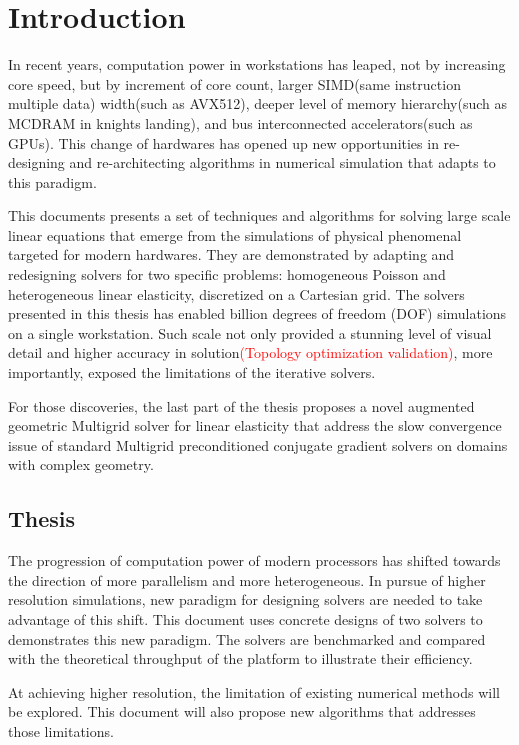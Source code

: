 \chapter{Introduction}
In recent years, computation power in workstations has leaped, not by increasing core speed,  but by increment of core count, larger SIMD(same instruction multiple data) width(such as AVX512), deeper level of memory hierarchy(such as MCDRAM in knights landing), and bus interconnected accelerators(such as GPUs). This change of hardwares has opened up new opportunities in re-designing and re-architecting algorithms in numerical simulation that adapts to this paradigm.

This documents presents a set of techniques and algorithms for solving large scale linear equations that emerge from the simulations of physical phenomenal targeted for modern hardwares. They are demonstrated by adapting and redesigning solvers for two specific problems: homogeneous Poisson and heterogeneous linear elasticity, discretized on a Cartesian grid. The solvers presented  in this thesis has enabled billion degrees of freedom (DOF) simulations on a single workstation. Such scale not only provided a stunning level of visual detail and higher accuracy in solution\textcolor{red}{(Topology optimization validation)}, more importantly, exposed the limitations of the iterative solvers.

For those discoveries, the last part of the thesis proposes a novel augmented geometric Multigrid solver for linear elasticity that address the slow convergence issue of standard Multigrid preconditioned conjugate gradient solvers on domains with complex geometry.

\section{Thesis}

The progression of computation power of modern processors has shifted towards the direction of more parallelism and more heterogeneous. In pursue of higher resolution simulations, new paradigm for designing solvers are needed to take advantage of this shift. This document uses concrete designs of two solvers to demonstrates this new paradigm. The solvers are benchmarked and compared with the theoretical throughput of the platform to illustrate their efficiency.

At achieving higher resolution, the limitation of existing numerical methods will be explored. This document will also propose new algorithms that addresses those limitations. 


